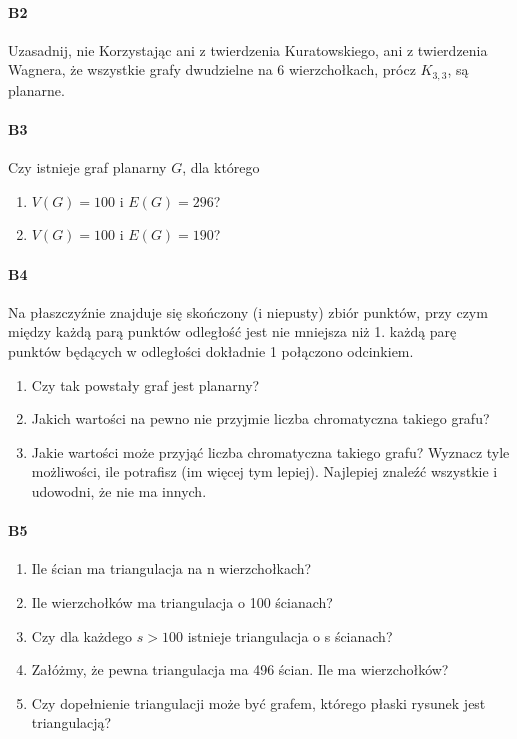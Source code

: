 \documentclass[a4paper,12pt]{article}
\theoremstyle{definition}%
\theoremstyle{definition}
\theoremstyle{problem}
\begin{document}
\paragraph{B2} Uzasadnij, nie Korzystając ani z twierdzenia Kuratowskiego, ani z twierdzenia Wagnera, że wszystkie
grafy dwudzielne na 6 wierzchołkach, prócz $K_{3,3}$, są planarne.

\paragraph{B3} Czy istnieje graf planarny $G$, dla którego
\begin{enumerate}[label=\alph*)]
\item $V(G) = 100$ i $E(G) = 296$?
\item $V(G) = 100$ i $E(G) = 190$?
\end{enumerate}

\paragraph{B4} Na płaszczyźnie znajduje się skończony (i niepusty) zbiór punktów, przy czym między każdą
parą punktów odległość jest nie mniejsza niż 1. każdą parę punktów będących w odległości dokładnie 1 połączono odcinkiem.
\begin{enumerate}[label=\alph*)]
\item Czy tak powstały graf jest planarny?
\item Jakich wartości na pewno nie przyjmie liczba chromatyczna takiego grafu?
\item Jakie wartości może przyjąć liczba chromatyczna takiego grafu? Wyznacz tyle możliwości, ile potrafisz (im więcej tym lepiej). Najlepiej znaleźć wszystkie i udowodni, że nie ma innych.
\end{enumerate}

\paragraph{B5}
\begin{enumerate}[label=\alph*)]
\item Ile ścian ma triangulacja na n wierzchołkach?
\item Ile wierzchołków ma triangulacja o 100 ścianach?
\item Czy dla każdego $s > 100$ istnieje triangulacja o s ścianach?
\item Załóżmy, że pewna triangulacja ma 496 ścian. Ile ma wierzchołków?
\item Czy dopełnienie triangulacji może być grafem, którego płaski rysunek jest triangulacją? 
\end{enumerate}
\end{document}
